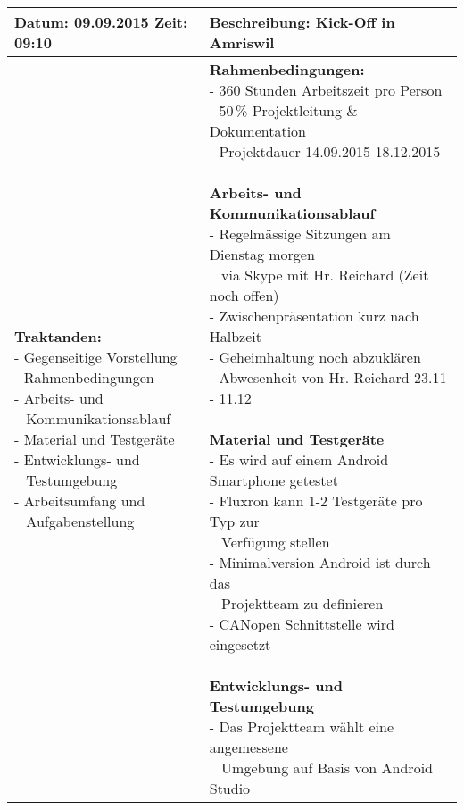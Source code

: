 \begin{table}[H]
\begin{tabularx}{\textwidth}{| l | X |}
\hline
\textbf{Datum:} 09.09.2015
\textbf{Zeit:} 09:10
&
\textbf{Beschreibung:} Kick-Off in Amriswil \\ \hline
\specialcell[t]{
\textbf{Traktanden:}\\
- Gegenseitige Vorstellung\\
- Rahmenbedingungen\\
- Arbeits- und\\~ Kommunikationsablauf\\
- Material und Testgeräte\\
- Entwicklungs- und\\~ Testumgebung\\
- Arbeitsumfang und\\~ Aufgabenstellung\\}
& 
\specialcell[t]{
\textbf{Rahmenbedingungen:}\\
- 360 Stunden Arbeitszeit pro Person\\
- 50\,\% Projektleitung \& Dokumentation\\
- Projektdauer 14.09.2015-18.12.2015\\
\\
\textbf{Arbeits- und Kommunikationsablauf}\\
- Regelmässige Sitzungen am Dienstag morgen\\~ via Skype mit Hr. Reichard (Zeit noch offen)\\
- Zwischenpräsentation kurz nach Halbzeit\\
- Geheimhaltung noch abzuklären\\
- Abwesenheit von Hr. Reichard 23.11 - 11.12\\
\\
\textbf{Material und Testgeräte}\\
- Es wird auf einem Android Smartphone getestet\\
- Fluxron kann 1-2 Testgeräte pro Typ zur\\~ Verfügung stellen\\
- Minimalversion Android ist durch das\\~ Projektteam zu definieren\\
- CANopen Schnittstelle wird eingesetzt\\
\\
\textbf{Entwicklungs- und Testumgebung}\\
- Das Projektteam wählt eine angemessene\\~ Umgebung auf Basis von Android Studio\\
}
\end{tabularx}
\end{table}
